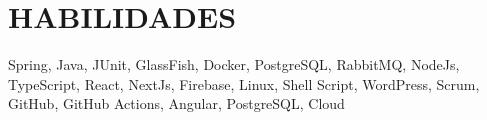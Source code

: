 
    \section{HABILIDADES}
    Spring, Java, JUnit, GlassFish, Docker, PostgreSQL, RabbitMQ, NodeJs, TypeScript, React, NextJs, Firebase, Linux, Shell Script, WordPress, Scrum, GitHub, GitHub Actions, Angular, PostgreSQL, Cloud 

